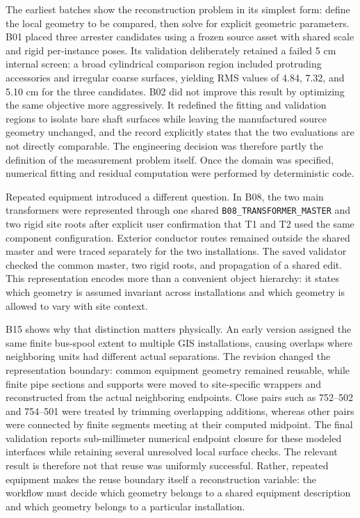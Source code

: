 \documentclass[10pt,a4paper]{article}
\begin{document}
The earliest batches show the reconstruction problem in its simplest
form: define the local geometry to be compared, then solve for explicit
geometric parameters. B01 placed three arrester candidates using a
frozen source asset with shared scale and rigid per-instance poses. Its
validation deliberately retained a failed 5 cm internal screen: a broad
cylindrical comparison region included protruding accessories and
irregular coarse surfaces, yielding RMS values of 4.84, 7.32, and 5.10
cm for the three candidates. B02 did not improve this result by
optimizing the same objective more aggressively. It redefined the
fitting and validation regions to isolate bare shaft surfaces while
leaving the manufactured source geometry unchanged, and the record
explicitly states that the two evaluations are not directly comparable.
The engineering decision was therefore partly the definition of the
measurement problem itself. Once the domain was specified, numerical
fitting and residual computation were performed by deterministic code.

Repeated equipment introduced a different question. In B08, the two main
transformers were represented through one shared
\texttt{B08\_TRANSFORMER\_MASTER} and two rigid site roots after
explicit user confirmation that T1 and T2 used the same component
configuration. Exterior conductor routes remained outside the shared
master and were traced separately for the two installations. The saved
validator checked the common master, two rigid roots, and propagation of
a shared edit. This representation encodes more than a convenient object
hierarchy: it states which geometry is assumed invariant across
installations and which geometry is allowed to vary with site context.

B15 shows why that distinction matters physically. An early version
assigned the same finite bus-spool extent to multiple GIS installations,
causing overlaps where neighboring units had different actual
separations. The revision changed the representation boundary: common
equipment geometry remained reusable, while finite pipe sections and
supports were moved to site-specific wrappers and reconstructed from the
actual neighboring endpoints. Close pairs such as 752--502 and 754--501
were treated by trimming overlapping additions, whereas other pairs were
connected by finite segments meeting at their computed midpoint. The
final validation reports sub-millimeter numerical endpoint closure for
these modeled interfaces while retaining several unresolved local
surface checks. The relevant result is therefore not that reuse was
uniformly successful. Rather, repeated equipment makes the reuse
boundary itself a reconstruction variable: the workflow must decide
which geometry belongs to a shared equipment description and which
geometry belongs to a particular installation.
\end{document}
